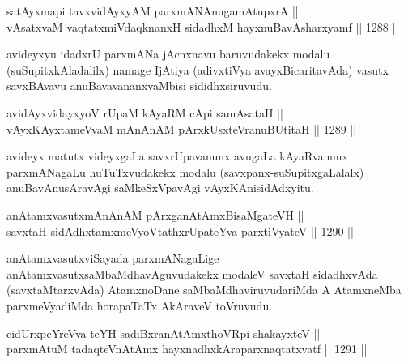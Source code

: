 
\begin{shl}
satAyxmapi tavxvidAyxyAM parxmANAnugamAtupxrA || \\
vAsatxvaM vaqtatxmiVdaqknanxH sidadhxM hayxnuBavAsharxyamf \hfill || 1288 || 
\end{shl}

\begin{artha}
avideyxyu idadxrU parxmANa jAcnxnavu baruvudakekx modalu (suSupitxkAladalilx) namage IjAtiya (adivxtiVya avayxBicaritavAda) vasutx savxBAvavu anuBavavananxvaMbisi sididhxsiruvudu.
\end{artha}

\begin{shl}
avidAyxvidayxyoV rUpaM kAyaRM cApi samAsataH || \\
vAyxKAyxtameVvaM mAnAnAM pArxkUsxteVranuBUtitaH \hfill || 1289 ||  
\end{shl}

\begin{artha}
avideyx matutx videyxgaLa savxrUpavanunx avugaLa kAyaRvanunx parxmANagaLu huTuTxvudakekx modalu (savxpanx-suSupitxgaLalalx) anuBavAnusAravAgi saMkeSxVpavAgi vAyxKAnisidAdxyitu.
\end{artha}

\begin{shl}
anAtamxvasutxmAnAnAM pArxganAtAmxBisaMgateVH ||  \\
savxtaH sidAdhxtamxmeVyoVtathxrUpateYva parxtiVyateV \hfill || 1290 ||  
\end{shl}

\begin{artha}
anAtamxvasutxviSayada parxmANagaLige anAtamxvasutxsaMbaMdhavAguvudakekx modaleV savxtaH sidadhxvAda (savxtaMtarxvAda) AtamxnoDane saMbaMdhaviruvudariMda A AtamxneMba parxmeVyadiMda horapaTaTx AkAraveV toVruvudu.
\end{artha}


\begin{shl}
cidUrxpeYreVva teYH sadiBxranAtAmxthoVR\s pi shakayxteV || \\
parxmAtuM tadaqteV\s nAtAmx hayxnadhxkAraparxnaqtatxvatf \hfill || 1291 ||  
\end{shl}

